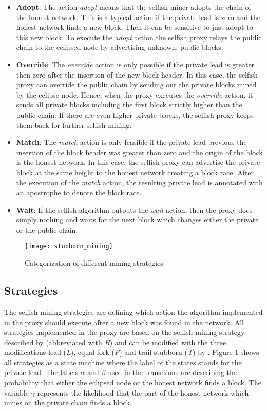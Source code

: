 \begin{itemize}
	\item \textbf{Adopt}: 
	The action \textit{adopt} means that the selfish miner adopts the chain of the honest network. 
	This is a typical action if the private lead is zero and the honest network finds a new block. 
	Then it can be sensitive to just adopt to this new block.
	To execute the \textit{adopt} action the selfish proxy relays the public chain to the eclipsed node by advertising unknown, public blocks.
	\item \textbf{Override}:
	The \textit{override} action is only possible if the private lead is greater then zero after the insertion of the new block header.
	In this case, the selfish proxy can override the public chain by sending out the private blocks mined by the eclipse node.
	Hence, when the proxy executes the \textit{override} action, it sends all private blocks including the first block strictly higher than the public chain.
	If there are even higher private blocks, the selfish proxy keeps them back for further selfish mining.
	\item \textbf{Match}:
	The \textit{match} action is only feasible if the private lead previous the insertion of the block header was greater than zero and the origin of the block is the honest network.
	In this case, the selfish proxy can advertise the private block at the same height to the honest network creating a block race.
	After the execution of the \textit{match} action, the resulting private lead is annotated with an apostrophe to denote the block race.
	\item \textbf{Wait}:
	If the selfish algorithm outputs the \textit{wait} action, then the proxy does simply nothing and waits for the next block which changes either the private or the public chain.
\end{itemize}

\begin{figure}[t]
\texttt{[image: stubborn\_mining]}
\centering
\caption{Categorization of different mining strategies \cite{nayak2016stubborn}}
\label{fig:stubborn_mining}
\end{figure}

\subsection{Strategies}

The selfish mining strategies are defining which action the algorithm implemented in the proxy should execute after a new block was found in the network.
All strategies implemented in the proxy are based on the selfish mining strategy described by \cite{eyal2014majority} (abbreviated with \textit{H}) and can be modified with the three modifications lead (\textit{L}), equal-fork (\textit{F}) and trail stubborn (\textit{T}) by \cite{nayak2016stubborn}.
Figure \ref{fig:stubborn_mining} shows all strategies as a state machine where the label of the states stands for the private lead.
The labels $\alpha$ and $\beta$ used in the transitions are describing the probability that either the eclipsed node or the honest network finds a block.
The variable $\gamma$ represents the likelihood that the part of the honest network which mines on the private chain finds a block.

